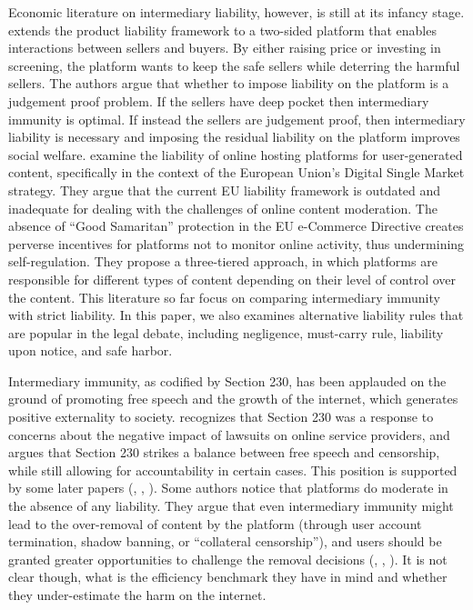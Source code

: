 Economic literature on intermediary liability, however, is still at its infancy stage. 
 extends the product liability framework to a two-sided platform that enables interactions between sellers and buyers. By either raising price or investing in screening, the platform wants to keep the safe sellers while deterring the harmful sellers. The authors argue that whether to impose liability on the platform is a judgement proof problem. If the sellers have deep pocket then intermediary immunity is optimal. If instead the sellers are judgement proof, then intermediary liability is necessary and imposing the residual liability on the platform improves social welfare.  
 examine the liability of online hosting platforms for user-generated content, specifically in the context of the European Union's Digital Single Market strategy. They argue that the current EU liability framework is outdated and inadequate for dealing with the challenges of online content moderation. The absence of ``Good Samaritan'' protection in the EU e-Commerce Directive creates perverse incentives for platforms not to monitor online activity, thus undermining self-regulation. 
They propose a three-tiered approach, in which platforms are responsible for different types of content depending on their level of control over the content. 
This literature so far focus on comparing intermediary immunity with strict liability. In this paper, we also examines alternative liability rules that are popular in the legal debate, including negligence, must-carry rule, liability upon notice, and safe harbor. 




Intermediary immunity, as codified by Section 230, has been applauded on the ground of promoting free speech and the growth of the internet, which generates positive externality to society.  recognizes that Section 230 was a response to concerns about the negative impact of lawsuits on online service providers, and argues that Section 230 strikes a balance between free speech and censorship, while still allowing for accountability in certain cases. This position is supported by some later papers (, , ).
Some authors notice that platforms do moderate in the absence of any liability. They argue that even intermediary immunity might lead to the over-removal of content by the platform (through user account termination, shadow banning, or ``collateral censorship''), and users should be granted greater opportunities to challenge the removal decisions (, , ). It is not clear though, what is the efficiency benchmark they have in mind and whether they under-estimate the harm on the internet.

